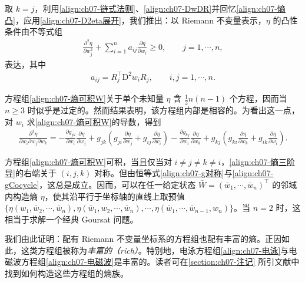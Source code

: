 \documentclass[../../main.tex]{subfiles}
\begin{document}
取 $k=j$，利用\eqref{align:ch07-链式法则}、\eqref{align:ch07-DwDR}并回忆\eqref{align:ch07-熵凸}，应用\eqref{align:ch07-D2eta展开}，我们推出：以 Riemann 不变量表示，$\eta$ 的凸性条件由不等式组
\begin{align}
\frac{\partial^2\eta}{\partial w_j^2}+\sum_{i=1}^n a_{ij}\frac{\partial\eta}{\partial w_i}\geqslant 0,\qquad j=1,\cdots,n,
\label{align:ch07-熵凸W}
\end{align}
表达，其中
\begin{align}
a_{ij}=R_j^\top\mathrm{D}^2 w_i R_j,\qquad i,j=1,\cdots,n.
\label{align:ch07-aij}
\end{align}

方程组\eqref{align:ch07-熵可积W}关于单个未知量 $\eta$ 含 $\frac12 n(n-1)$ 个方程，因而当 $n\geqslant 3$ 时似乎是过定的。然而结果表明，该方程组内部是相容的。为看出这一点，对 $w_i$ 求\eqref{align:ch07-熵可积W}的导数，得到
\begin{align}
\frac{\partial^3\eta}{\partial w_i\partial w_j\partial w_k}
=-\frac{\partial g_{jk}}{\partial w_i}\frac{\partial\eta}{\partial w_j}
+g_{jk}\left(g_{ji}\frac{\partial\eta}{\partial w_j}+g_{ij}\frac{\partial\eta}{\partial w_i}\right)
-\frac{\partial g_{kj}}{\partial w_i}\frac{\partial\eta}{\partial w_k}
+g_{kj}\left(g_{ki}\frac{\partial\eta}{\partial w_k}+g_{ik}\frac{\partial\eta}{\partial w_i}\right).
\label{align:ch07-熵三阶导}
\end{align}

方程组\eqref{align:ch07-熵可积W}可积，当且仅当对 $i\neq j\neq k\neq i$，\eqref{align:ch07-熵三阶导}的右端关于 $(i,j,k)$ 对称。但由恒等式\eqref{align:ch07-g对称}与\eqref{align:ch07-gCocycle}，这总是成立。因而，可以在任一给定状态 $\bar{W}=(\bar{w}_1,\cdots,\bar{w}_n)^\top$ 的邻域内构造熵 $\eta$，使其沿平行于坐标轴的直线上取预值 $\{\eta(w_1,\bar{w}_2,\cdots,\bar{w}_n),\eta(\bar{w}_1,w_2,\cdots,\bar{w}_n),\cdots,\eta(\bar{w}_1,\cdots,\bar{w}_{n-1},w_n)\}$。当 $n=2$ 时，这相当于求解一个经典 Goursat 问题。

我们由此证明：配有 Riemann 不变量坐标系的方程组也配有丰富的熵。正因如此，这类方程组被称为\emph{丰富的（rich）}。特别地，电泳方程组\eqref{align:ch07-电泳}与电磁波方程组\eqref{align:ch07-电磁波}是丰富的。读者可在\cref{section:ch07-注记}
所引文献中找到如何构造这些方程组的熵族。
\end{document}
